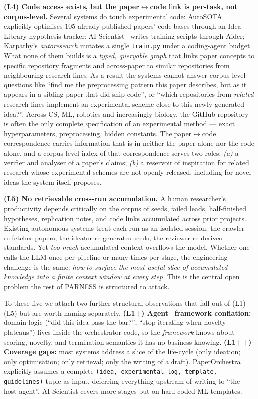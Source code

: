 \documentclass{article}
\newcommand{\parness}{\textsf{PARNESS}}
\newcommand{\code}[1]{\texttt{\small #1}}
\begin{document}
\textbf{(L4) Code access exists, but the paper$\leftrightarrow$code link
is per-task, not corpus-level.} Several systems do touch experimental
code: AutoSOTA~\cite{autosota} explicitly optimises $105$
already-published papers' code-bases through an Idea-Library hypothesis
tracker; AI-Scientist~\cite{aisciv1,aisciv2} writes training scripts
through Aider; Karpathy's \emph{autoresearch} mutates a single
\code{train.py} under a coding-agent budget. What none of them builds
is a \emph{typed, queryable graph} that links paper concepts to
specific repository fragments and across-paper to similar repositories
from neighbouring research lines. As a result the systems cannot
answer corpus-level questions like ``find me the preprocessing pattern
this paper describes, but as it appears in a sibling paper that did
ship code'', or ``which repositories from \emph{related} research lines
implement an experimental scheme close to this newly-generated idea?''.
Across CS, ML, robotics and increasingly biology, the GitHub repository
is often the only complete specification of an experimental method ---
exact hyperparameters, preprocessing, hidden constants. The
paper$\leftrightarrow$code correspondence carries information that is
in neither the paper alone nor the code alone, and a corpus-level
index of that correspondence serves two roles: \emph{(a)} a verifier
and analyser of a paper's claims; \emph{(b)} a reservoir of inspiration
for related research whose experimental schemes are not openly
released, including for novel ideas the system itself proposes.

\textbf{(L5) No retrievable cross-run accumulation.} A human researcher's
productivity depends critically on the corpus of seeds, failed leads,
half-finished hypotheses, replication notes, and code links accumulated
across prior projects. Existing autonomous systems treat each run as an
isolated session: the crawler re-fetches papers, the ideator re-generates
seeds, the reviewer re-derives standards. Yet \emph{too much}
accumulated context overflows the model. Whether one calls the LLM once
per pipeline or many times per stage, the engineering challenge is the
same: \emph{how to surface the most useful slice of accumulated knowledge
into a finite context window at every step.} This is the central open
problem the rest of \parness{} is structured to attack.

To these five we attach two further structural observations that fall
out of (L1)--(L5) but are worth naming separately. \textbf{(L1+) Agent--
framework conflation:} domain logic
(``did this idea pass the bar?'', ``stop iterating when novelty plateaus'')
lives inside the orchestrator code, so the \emph{framework} knows about
scoring, novelty, and termination semantics it has no business knowing.
\textbf{(L1++) Coverage gaps:} most systems address a slice of the
life-cycle (only ideation; only optimisation; only retrieval; only the
writing of a draft). PaperOrchestra explicitly assumes a complete
\code{(idea, experimental log, template, guidelines)} tuple as input,
deferring everything upstream of writing to ``the host agent''.
AI-Scientist covers more stages but on hard-coded ML templates.
\end{document}
